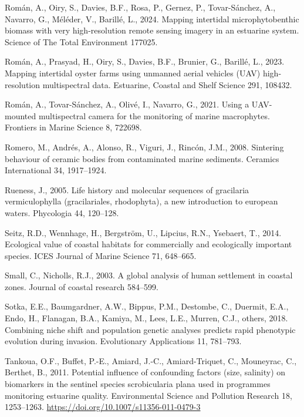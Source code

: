 \documentclass[
  letterpaper,
  DIV=11,
  numbers=noendperiod]{scrartcl}
\newlength{\cslhangindent}
\newenvironment{CSLReferences}[2] %
 {\begin{list}{}{%
  \setlength{\itemindent}{0pt}
  \setlength{\leftmargin}{0pt}
  \setlength{\parsep}{0pt}
  \ifodd #1
   \setlength{\leftmargin}{\cslhangindent}
   \setlength{\itemindent}{-1\cslhangindent}
  \fi
  \setlength{\itemsep}{#2\baselineskip}}}
 {\end{list}}
\begin{document}
\begin{CSLReferences}{1}{0}
Román, A., Oiry, S., Davies, B.F., Rosa, P., Gernez, P., Tovar-Sánchez,
A., Navarro, G., Méléder, V., Barillé, L., 2024. Mapping intertidal
microphytobenthic biomass with very high-resolution remote sensing
imagery in an estuarine system. Science of The Total Environment 177025.

Román, A., Prasyad, H., Oiry, S., Davies, B.F., Brunier, G., Barillé,
L., 2023. Mapping intertidal oyster farms using unmanned aerial vehicles
(UAV) high-resolution multispectral data. Estuarine, Coastal and Shelf
Science 291, 108432.

Román, A., Tovar-Sánchez, A., Olivé, I., Navarro, G., 2021. Using a
UAV-mounted multispectral camera for the monitoring of marine
macrophytes. Frontiers in Marine Science 8, 722698.

Romero, M., Andrés, A., Alonso, R., Viguri, J., Rincón, J.M., 2008.
Sintering behaviour of ceramic bodies from contaminated marine
sediments. Ceramics International 34, 1917--1924.

Rueness, J., 2005. Life history and molecular sequences of gracilaria
vermiculophylla (gracilariales, rhodophyta), a new introduction to
european waters. Phycologia 44, 120--128.

Seitz, R.D., Wennhage, H., Bergström, U., Lipcius, R.N., Ysebaert, T.,
2014. Ecological value of coastal habitats for commercially and
ecologically important species. ICES Journal of Marine Science 71,
648--665.

Small, C., Nicholls, R.J., 2003. A global analysis of human settlement
in coastal zones. Journal of coastal research 584--599.

Sotka, E.E., Baumgardner, A.W., Bippus, P.M., Destombe, C., Duermit,
E.A., Endo, H., Flanagan, B.A., Kamiya, M., Lees, L.E., Murren, C.J.,
others, 2018. Combining niche shift and population genetic analyses
predicts rapid phenotypic evolution during invasion. Evolutionary
Applications 11, 781--793.

Tankoua, O.F., Buffet, P.-E., Amiard, J.-C., Amiard-Triquet, C.,
Mouneyrac, C., Berthet, B., 2011. Potential influence of confounding
factors (size, salinity) on biomarkers in the sentinel species
scrobicularia plana used in programmes monitoring estuarine quality.
Environmental Science and Pollution Research 18, 1253--1263.
\url{https://doi.org/10.1007/s11356-011-0479-3}


\end{CSLReferences}
\end{document}
